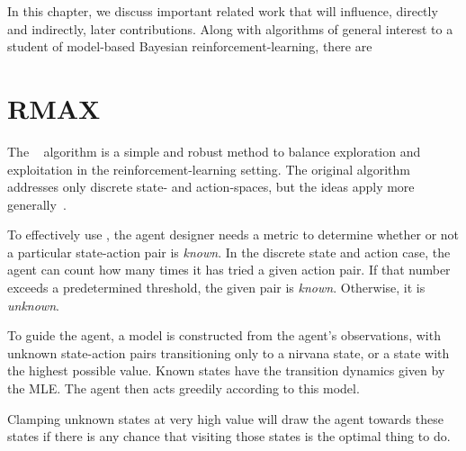 
In this chapter, we discuss important related work that will influence, directly and indirectly, later contributions.  Along with algorithms of general interest to a student of model-based Bayesian reinforcement-learning, there are
\section{RMAX}

The ~\cite{brafman03} algorithm is a simple and robust method to balance exploration and exploitation in the reinforcement-learning setting. The original algorithm addresses only discrete state- and action-spaces, but the ideas apply more generally~\cite{nouri09,jong07}.

To effectively use , the agent designer needs a metric to determine whether or not a particular state-action pair is \emph{known}. In the discrete state and action case, the agent can count how many times it has tried a given action pair. If that number exceeds a predetermined threshold, the given pair is \emph{known}. Otherwise, it is \emph{unknown}.

To guide the  agent, a model is constructed from the agent's observations, with unknown state-action pairs transitioning only to a nirvana state, or a state with the highest possible value. Known states have the transition dynamics given by the MLE. The agent then acts greedily according to this model.

Clamping unknown states at very high value will draw the agent towards these states if there is any chance that visiting those states is the optimal thing to do.

